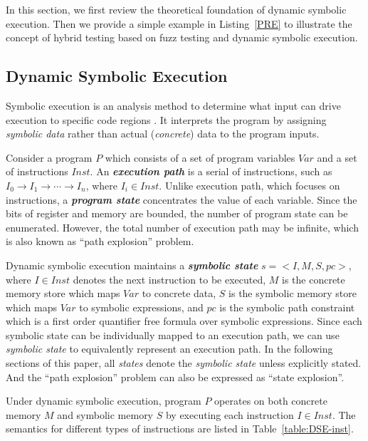 
In this section, we first review the theoretical foundation of dynamic
symbolic execution. Then we provide a simple example in
Listing~\ref{PRE} to illustrate the concept of hybrid testing based on
fuzz testing and dynamic symbolic execution.

\subsection{Dynamic Symbolic Execution}

Symbolic execution is an analysis method to determine what input can
drive execution to specific code regions \cite{King:Symbex}. It
interprets the program by assigning \textit{symbolic data} rather than
actual (\textit{concrete}) data to the program inputs.

Consider a program $P$ which consists of a set of program variables
$Var$ and a set of instructions $Inst$. 
An \textbf{\textit{execution path}} is a serial of instructions, such as 
$I_0\rightarrow I_1 \rightarrow \cdots\rightarrow I_n$, where $I_i\in Inst$.
Unlike execution path, which focuses on instructions, a 
\textbf{\textit{program state}} concentrates the value of each variable. 
Since the bits of register and memory are bounded, the number of program
state can be enumerated. However, the total number of execution path 
may be infinite, which is also known as ``path explosion'' problem.

Dynamic symbolic execution
maintains a \textbf{\textit{symbolic state}} $s=<I,M,S,pc>$, where 
$I\in Inst$ denotes the next instruction to be executed, 
$M$ is the concrete memory store which maps $Var$ to concrete data, 
$S$ is the symbolic memory store which maps $Var$ to symbolic expressions, 
and $pc$ is the symbolic path constraint which is a first order 
quantifier free formula over symbolic expressions. Since each symbolic state 
can be individually mapped to an execution path, we can use \textit{symbolic state} 
to equivalently represent an execution path.
In the following sections of this paper, all \textit{states} 
denote the \textit{symbolic state} unless explicitly stated. 
And the ``path explosion'' problem can also be expressed as ``state explosion''.

Under dynamic symbolic execution, program $P$ operates on both concrete
memory $M$ and symbolic memory $S$ by executing each instruction $I\in
Inst$. The semantics for different types of instructions are listed in
Table~\ref{table:DSE-inst}.

